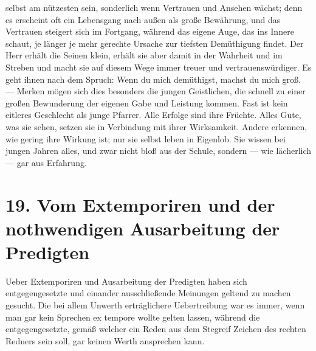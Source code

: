 selbst am nützesten sein, sonderlich wenn Vertrauen und Ansehen wächst; denn es erscheint oft ein Lebensgang nach außen als große Bewährung, und das Vertrauen steigert sich im Fortgang, während das eigene Auge, das ins Innere schaut, je länger je mehr gerechte Ursache zur tiefsten Demüthigung findet. Der Herr erhält die Seinen klein, erhält sie aber damit in der Wahrheit und im Streben und macht sie auf diesem Wege immer treuer und vertrauenswürdiger. Es geht ihnen nach dem Spruch: Wenn du mich demüthigst, machst du mich groß. — Merken mögen sich dies besonders die jungen Geistlichen, die schnell zu einer großen Bewunderung der eigenen Gabe und Leistung kommen. Fast ist kein eitleres Geschlecht als junge Pfarrer. Alle Erfolge sind ihre Früchte. Alles Gute, was sie sehen, setzen sie in Verbindung mit ihrer Wirksamkeit. Andere erkennen, wie gering ihre Wirkung ist; nur sie selbst leben in Eigenlob. Sie wissen bei jungen Jahren alles, und zwar nicht bloß aus der Schule, sondern — wie lächerlich — gar aus Erfahrung.

\section[19. Vom Extemporiren]{19. Vom Extemporiren und der nothwendigen Ausarbeitung der Predigten}

Ueber Extemporiren und Ausarbeitung der Predigten haben sich entgegengesetzte und einander ausschließende Meinungen geltend zu machen gesucht. Die bei allem Unwerth erträglichere Uebertreibung war es immer, wenn man gar kein Sprechen ex tempore wollte gelten lassen, während die entgegengesetzte,
gemäß welcher ein Reden aus dem Stegreif Zeichen des rechten Redners sein soll, gar keinen Werth ansprechen kann.


